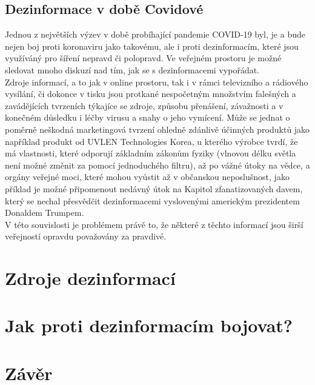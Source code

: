 \subsection{Dezinformace v době Covidové}

Jednou z největších výzev v době probíhající pandemie COVID-19 byl, je a bude nejen boj proti koronaviru jako takovému, ale i proti dezinformacím, které jsou využíváný pro šíření nepravd či polopravd. Ve veřejném prostoru je možné sledovat mnoho diskuzí nad tím, jak se s dezinformacemi vypořádat.\\

Zdroje informací, a to jak v online prostoru, tak i v rámci televizního a rádiového vysílání, či dokonce v tisku jsou protkané nespočetným množstvím falešných a zavádějících tvrzeních týkajíce se zdroje, způsobu přenášení, závažnosti a v konečném důsledku i léčby virusu a snahy o jeho vymícení. Může se jednat o poměrně neškodná marketingová tvrzení ohledně zdánlivě účinných produktů jako například produkt od UVLEN \textregistered Technologies Korea\cite{uvlen__uvlen_nodate}, u kterého výrobce tvrdí, že má vlastnosti, které odporují základním zákonům fyziky (vlnovou délku světla není možné změnit za pomocí jednoduchého filtru), až po vážné útoky na vědce, a orgány veřejné moci, které mohou vyůstit až v občanskou neposlušnost, jako příklad je možné připomenout nedávný útok na Kapitol zfanatizovaných davem, který se nechal přesvědčit dezinformacemi vyslovenými americkým prezidentem Donaldem Trumpem.\\

V této souvislosti je problémem právě to, že některé z těchto informací jsou širší veřejností opravdu považovány za pravdivé.

\section{Zdroje dezinformací}

\section{Jak proti dezinformacím bojovat?}

\section{Závěr}